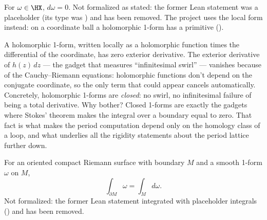 \begin{lemma}
\label{lem:holomorphic-form-is-closed}
For \(\omega\in\HX\), \(d\omega=0\).
Not formalized as stated: the former Lean statement was a placeholder (its type was
) and has been removed. The project uses the local form instead: on a
coordinate ball a holomorphic 1-form has a primitive ().
\end{lemma}

\begin{layman}
A holomorphic 1-form, written locally as a holomorphic function times the
differential of the coordinate, has zero exterior derivative. The
exterior derivative of \(h(z)\,dz\) --- the gadget that measures
``infinitesimal swirl'' --- vanishes because of the Cauchy--Riemann
equations: holomorphic functions don't depend on the conjugate
coordinate, so the only term that could appear cancels automatically.
Concretely, holomorphic 1-forms are \emph{closed}: no swirl, no
infinitesimal failure of being a total derivative. Why bother? Closed
1-forms are exactly the gadgets where Stokes' theorem makes the integral
over a boundary equal to zero. That fact is what makes the period
computation depend only on the homology class of a loop, and what
underlies all the rigidity statements about the period lattice further
down.
\end{layman}

\begin{theorem}
\label{thm:stokes-on-rs-with-boundary}
For an oriented compact Riemann surface with boundary \(M\) and a smooth
1-form \(\omega\) on \(M\),
\[
  \int_{\partial M}\omega = \int_{M} d\omega.
\]
Not formalized: the former Lean statement integrated with placeholder integrals
() and has been removed.
\end{theorem}

